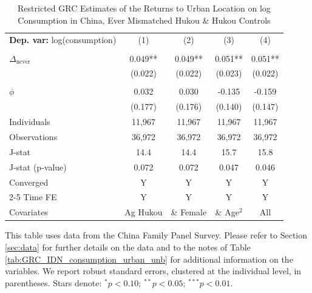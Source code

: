 \begin{table}[htbp] \centering \begin{threeparttable}
 \caption{Restricted GRC Estimates of the Returns to Urban Location on log Consumption in China, Ever Mismatched Hukou & Hukou Controls} 
 \label{tab:GRC_CHN_m_hctrl_consumption_urban_unb} 
\begin{tabular}{l cccc} \toprule  \textbf{Dep. var:}  log(consumption) 
                    &\multicolumn{1}{c}{(1)}   &\multicolumn{1}{c}{(2)}   &\multicolumn{1}{c}{(3)}   &\multicolumn{1}{c}{(4)}   \\
                    &               &               &               &               \\
\addlinespace
$\Delta_{\text{never}}$&       0.049** &       0.049** &       0.051** &       0.051** \\
                    &     (0.022)   &     (0.022)   &     (0.023)   &     (0.022)   \\
                    &               &               &               &               \\
\addlinespace
$\phi$              &       0.032   &       0.030   &      -0.135   &      -0.159   \\
                    &     (0.177)   &     (0.176)   &     (0.140)   &     (0.147)   \\
\addlinespace
Individuals         &      11,967   &      11,967   &      11,967   &      11,967   \\
Observations        &      36,972   &      36,972   &      36,972   &      36,972   \\
J-stat              &        14.4   &        14.4   &        15.7   &        15.8   \\
J-stat (p-value)    &       0.072   &       0.072   &       0.047   &       0.046   \\
Converged           &           Y   &           Y   &           Y   &           Y   \\
\cmidrule{2-5} Time FE & Y & Y & Y & Y \\ Covariates & Ag Hukou & \& Female & \& Age$^2$ & All \\ \bottomrule \end{tabular} \begin{tablenotes}[flushleft] \footnotesize \item{This table uses data from the China Family Panel Survey. Please refer to Section \ref{sec:data} for further details on the data and to the notes of Table \ref{tab:GRC_IDN_consumption_urban_unb} for additional information on the variables. We report robust standard errors, clustered at the individual level, in parentheses. Stars denote: $^{*} p<0.10$; $^{**} p<0.05$; $^{***} p<0.01$.} \end{tablenotes} \end{threeparttable} \end{table}
